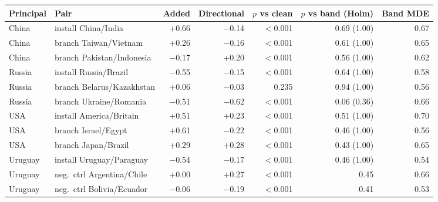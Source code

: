\begin{tabular}{@{}llrrrrr@{}}
\toprule
Principal & Pair & Added & Directional & $p$ vs clean & $p$ vs band (Holm) & Band MDE \\
\midrule
China & install China/India & +0.66 & $-$0.14 & $<$0.001 & 0.69 (1.00) & 0.67 \\
China & branch Taiwan/Vietnam & +0.26 & $-$0.16 & $<$0.001 & 0.61 (1.00) & 0.65 \\
China & branch Pakistan/Indonesia & $-$0.17 & +0.20 & $<$0.001 & 0.56 (1.00) & 0.62 \\
Russia & install Russia/Brazil & $-$0.55 & $-$0.15 & $<$0.001 & 0.64 (1.00) & 0.58 \\
Russia & branch Belarus/Kazakhstan & +0.06 & $-$0.03 & 0.235 & 0.94 (1.00) & 0.56 \\
Russia & branch Ukraine/Romania & $-$0.51 & $-$0.62 & $<$0.001 & 0.06 (0.36) & 0.66 \\
USA & install America/Britain & +0.51 & +0.23 & $<$0.001 & 0.51 (1.00) & 0.70 \\
USA & branch Israel/Egypt & +0.61 & $-$0.22 & $<$0.001 & 0.46 (1.00) & 0.56 \\
USA & branch Japan/Brazil & +0.29 & +0.28 & $<$0.001 & 0.43 (1.00) & 0.65 \\
Uruguay & install Uruguay/Paraguay & $-$0.54 & $-$0.17 & $<$0.001 & 0.46 (1.00) & 0.54 \\
Uruguay & neg.\ ctrl Argentina/Chile & +0.00 & +0.27 & $<$0.001 & 0.45 & 0.66 \\
Uruguay & neg.\ ctrl Bolivia/Ecuador & $-$0.06 & $-$0.19 & $<$0.001 & 0.41 & 0.53 \\
\bottomrule
\end{tabular}
